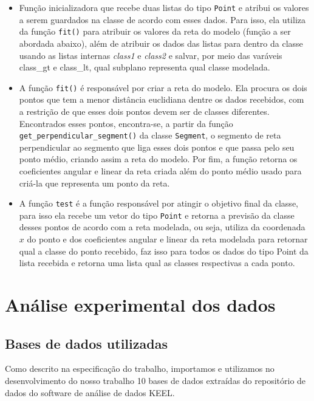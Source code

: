 \documentclass{article}
\begin{document}
{\begin{itemize}
	\item Função inicializadora que recebe duas listas do tipo \texttt{Point} e atribui os valores a serem guardados na classe de acordo com esses dados. Para isso, ela utiliza da função \texttt{fit()} para atribuir os valores da reta do modelo (função a ser abordada abaixo), além de atribuir os dados das listas para dentro da classe usando as listas internas \textit{class1} e \textit{class2} e salvar, por meio das varáveis class\_gt e class\_lt, qual subplano representa qual classe modelada.

	\item A função \texttt{fit()} é responsável por criar a reta do modelo. Ela procura os dois pontos que tem a menor distância euclidiana dentre os dados recebidos, com a restrição de que esses dois pontos devem ser de classes diferentes. Encontrados esses pontos, encontra-se, a partir da função \texttt{get\_perpendicular\_segment()} da classe \texttt{Segment}, o segmento de reta perpendicular ao segmento que liga esses dois pontos e que passa pelo seu ponto médio, criando assim a reta do modelo. Por fim, a função retorna os coeficientes angular e linear da reta criada além do ponto médio usado para criá-la que representa um ponto da reta.

	\item A função \texttt{test} é a função responsável por atingir o objetivo final da classe, para isso ela recebe um vetor do tipo \texttt{Point} e retorna a previsão da classe desses pontos de acordo com a reta modelada, ou seja, utiliza da coordenada \( x \) do ponto e dos coeficientes angular e linear da reta modelada para retornar qual a classe do ponto recebido, faz isso para todos os dados do tipo Point da lista recebida e retorna uma lista qual as classes respectivas a cada ponto.

\end{itemize}}

\section{Análise experimental dos dados}

\subsection{Bases de dados utilizadas}

Como descrito na especificação do trabalho, importamos e utilizamos no desenvolvimento do nosso trabalho 10 bases de dados extraídas do repositório de dados do software de análise de dados KEEL.
\end{document}
